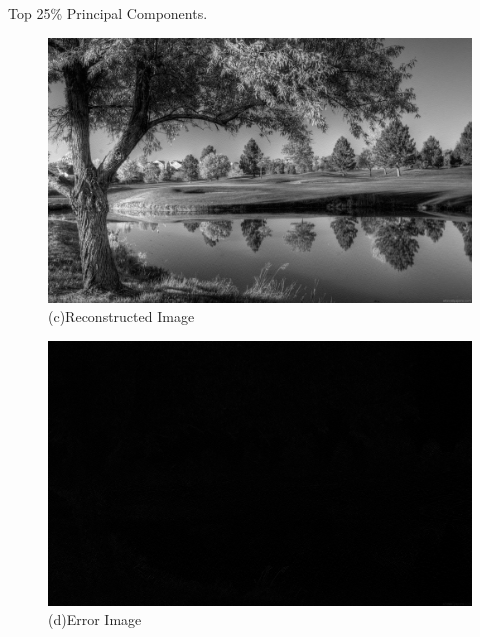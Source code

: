 \documentclass[a4 paper]{article}
\begin{document}
Top 25\% Principal Components.\\
\begin{figure}[!htb]
    \centering
    \begin{minipage}{0.49\textwidth}
        \centering
        \includegraphics[width=1\textwidth]{R25.png} \\
         (c)Reconstructed Image
    \end{minipage}\hfill
    \begin{minipage}{0.49\textwidth}
        \centering
        \includegraphics[width=1\textwidth]{E25.png}\\
         (d)Error Image
    \end{minipage}
    \label{fig:l}
\end{figure}
\end{document}
